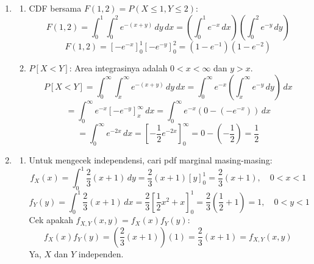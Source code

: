 \documentclass[12pt,a4paper]{article}
\begin{document}
\begin{enumerate}
  \item
        \begin{enumerate}[label=(\alph*)]
          \item CDF bersama $F(1,2) = P(X \le 1, Y \le 2)$:
                \[ F(1,2) = \int_{0}^{1} \int_{0}^{2} e^{-(x+y)} \,dy \,dx = \left( \int_{0}^{1} e^{-x} \,dx \right) \left( \int_{0}^{2} e^{-y} \,dy \right) \]
                \[ F(1,2) = \left[ -e^{-x} \right]_0^1 \left[ -e^{-y} \right]_0^2 = \left( 1 - e^{-1} \right) \left( 1 - e^{-2} \right) \]

          \item $P[X < Y]$:
                Area integrasinya adalah $0 < x < \infty$ dan $y > x$.
                \[ P[X < Y] = \int_{0}^{\infty} \int_{x}^{\infty} e^{-(x+y)} \,dy \,dx = \int_{0}^{\infty} e^{-x} \left( \int_{x}^{\infty} e^{-y} \,dy \right) \,dx \]
                \[ = \int_{0}^{\infty} e^{-x} \left[ -e^{-y} \right]_x^{\infty} \,dx = \int_{0}^{\infty} e^{-x} (0 - (-e^{-x})) \,dx \]
                \[ = \int_{0}^{\infty} e^{-2x} \,dx = \left[ -\frac{1}{2} e^{-2x} \right]_0^{\infty} = 0 - \left(-\frac{1}{2}\right) = \frac{1}{2} \]
        \end{enumerate}

  \item
        \begin{enumerate}[label=(\alph*)]
          \item Untuk mengecek independensi, cari pdf marginal masing-masing:
                \[ f_X(x) = \int_{0}^{1} \frac{2}{3}(x+1) \,dy = \frac{2}{3}(x+1) [y]_0^1 = \frac{2}{3}(x+1), \quad 0 < x < 1 \]
                \[ f_Y(y) = \int_{0}^{1} \frac{2}{3}(x+1) \,dx = \frac{2}{3} \left[ \frac{1}{2}x^2 + x \right]_0^1 = \frac{2}{3} \left( \frac{1}{2} + 1 \right) = 1, \quad 0 < y < 1 \]
                Cek apakah $f_{X,Y}(x,y) = f_X(x) f_Y(y)$:
                \[ f_X(x) f_Y(y) = \left( \frac{2}{3}(x+1) \right) (1) = \frac{2}{3}(x+1) = f_{X,Y}(x,y) \]
                Ya, $X$ dan $Y$ independen.


\end{enumerate}
\end{enumerate}
\end{document}

